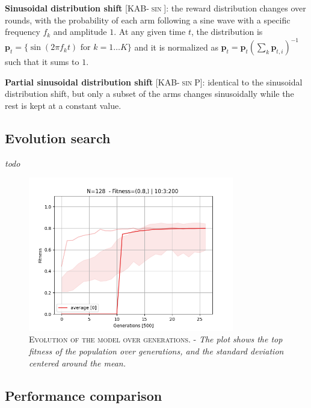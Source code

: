 \noindent \textbf{Sinusoidal distribution shift} [\textsc{KAB-$\sin$}]: the reward distribution changes over rounds, with the probability of each arm following a sine wave with a specific frequency $f_{k}$ and amplitude $1$. At any given time $t$, the distribution is $\mathbf{p}_{t}=\{\sin(2\pi f_{k}
t)\text{  for }k=1\ldots K\}$ and it is
normalized as $\mathbf{p}_{t} = \mathbf{p}_{t}(\sum_{k} \mathbf{p}_{t,i})^{-1}$ such that it sums to $1$.

\noindent \textbf{Partial sinusoidal distribution shift} [\textsc{KAB-$\sin$P}]: identical to the sinusoidal distribution shift, but only a subset of the arms changes sinusoidally while the rest is kept at a constant value.


\subsection{Evolution search}
\textit{todo}

\begin{figure}[h]
    \centering
    \includegraphics[width=0.8\textwidth]{figures/evolution_plot.png}
    \caption{\textsc{Evolution of the model over generations.} - \textit{The plot shows the top fitness of the population over generations, and the standard deviation centered around the mean.}}
    \label{fig:evolution}
\end{figure}


\subsection{Performance comparison}

